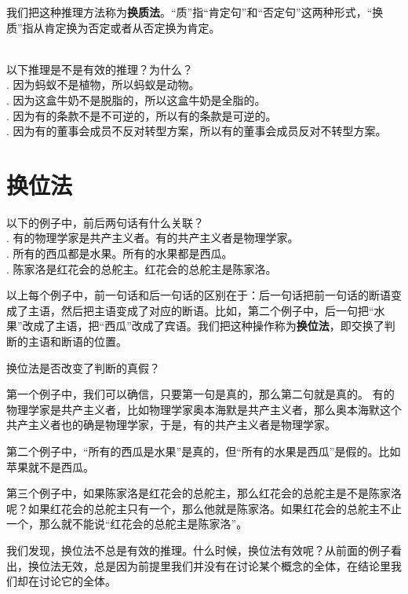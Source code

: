 \documentclass[12pt,UTF8,fontset=none]{ctexbook}
\begin{document}
我们把这种推理方法称为\textbf{换质法}。“质”指“肯定句”和“否定句”这两种形式，“换质”指从肯定换为否定或者从否定换为肯定。
\begin{xt}\label{xt:2b-0-0}
    \mbox{} \\
    以下推理是不是有效的推理？为什么？\\
    . 因为蚂蚁不是植物，所以蚂蚁是动物。 \\
    . 因为这盒牛奶不是脱脂的，所以这盒牛奶是全脂的。 \\
    . 因为有的条款不是不可逆的，所以有的条款是可逆的。 \\
    . 因为有的董事会成员不反对转型方案，所以有的董事会成员反对不转型方案。
\end{xt}

\section{换位法}
\begin{et}\label{et:2b-1-0} 
    以下的例子中，前后两句话有什么关联？\\
    . 有的物理学家是共产主义者。有的共产主义者是物理学家。\\
    . 所有的西瓜都是水果。所有的水果都是西瓜。\\
    . 陈家洛是红花会的总舵主。红花会的总舵主是陈家洛。
\end{et}
以上每个例子中，前一句话和后一句话的区别在于：后一句话把前一句话的断语变成了主语，然后把主语变成了对应的断语。比如，第二个例子中，后一句把“水果”改成了主语，把“西瓜”改成了宾语。我们把这种操作称为\textbf{换位法}，即交换了判断的主语和断语的位置。

换位法是否改变了判断的真假？

第一个例子中，我们可以确信，只要第一句是真的，那么第二句就是真的。
有的物理学家是共产主义者，比如物理学家奥本海默是共产主义者，那么奥本海默这个共产主义者也的确是物理学家，于是，有的共产主义者是物理学家。

第二个例子中，“所有的西瓜是水果”是真的，但“所有的水果是西瓜”是假的。比如苹果就不是西瓜。

第三个例子中，如果陈家洛是红花会的总舵主，那么红花会的总舵主是不是陈家洛呢？如果红花会的总舵主只有一个，那么他就是陈家洛。如果红花会的总舵主不止一个，那么就不能说“红花会的总舵主是陈家洛”。

我们发现，换位法不总是有效的推理。什么时候，换位法有效呢？从前面的例子看出，换位法无效，总是因为前提里我们并没有在讨论某个概念的全体，在结论里我们却在讨论它的全体。
\end{document}

